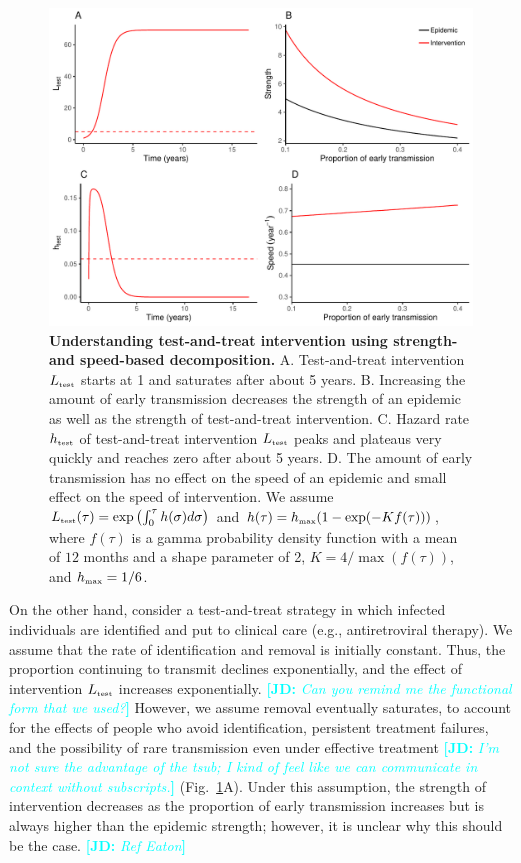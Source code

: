 \documentclass[12pt]{article}\usepackage[]{graphicx}\usepackage[]{color}
\newcommand{\comment}[3]{\textcolor{#1}{\textbf{[#2: }\textit{#3}\textbf{]}}}
\newcommand{\jd}[1]{\comment{cyan}{JD}{#1}}
\newcommand{\tsub}[2]{#1_{{\textrm{\tiny #2}}}}
\newcommand{\figref}[1]{Fig.~\ref{fig:#1}}
\newcommand{\figlab}[1]{\label{fig:#1}}
\begin{document}
\begin{figure}[!t]
\includegraphics[width=\textwidth]{../figure/figure3.pdf}
\caption{
\textbf{Understanding test-and-treat intervention using strength- and speed-based decomposition.}
A. Test-and-treat intervention $\tsub{L}{test}$ starts at 1 and saturates after about 5 years.
B. Increasing the amount of early transmission decreases the strength of an epidemic as well as the strength of test-and-treat intervention.
C. Hazard rate $\tsub{h}{test}$ of test-and-treat intervention $\tsub{L}{test}$ peaks and plateaus very quickly and reaches zero after about 5 years.
D. The amount of early transmission has no effect on the speed of an epidemic and small effect on the speed of intervention.
We assume $\tsub{L}{test}(\tau) = \exp\left(\int_0^\tau h(\sigma) d\sigma \right)$ and $h(\tau) = \tsub{h}{max} (1 - \exp(- K f(\tau)))$, where $f(\tau)$ is a gamma probability density function with a mean of $12$ months and a shape parameter of 2, $K = 4/\max(f(\tau))$, and $\tsub{h}{max} = 1/6$.
}
\figlab{test}
\end{figure}

On the other hand, consider a test-and-treat strategy in which infected individuals are identified and put to clinical care (e.g., antiretroviral therapy).
We assume that the rate of identification and removal is initially constant. Thus, the proportion continuing to transmit declines exponentially, and the effect of intervention $\tsub{L}{test}$ increases exponentially.
\jd{Can you remind me the functional form that we used?}
However, we assume removal eventually saturates, to account for the effects of people who avoid identification, persistent treatment failures, and the possibility of rare transmission even under effective treatment
\jd{I'm not sure the advantage of the tsub; I kind of feel like we can communicate in context without subscripts.} (\figref{test}A).
Under this assumption, the strength of intervention decreases as the proportion of early transmission increases but is always higher than the epidemic strength; however, it is unclear why this should be the case. \jd{Ref Eaton}
\end{document}
